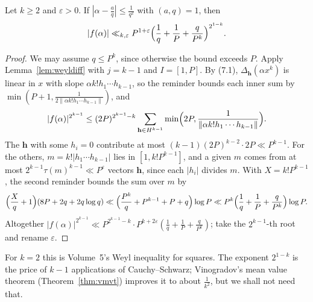 \begin{theorem}\label{thm:weylk}
Let $k\ge2$ and $\varepsilon>0$. If $|\alpha-\frac aq|\le\frac1{q^2}$ with $(a,q)=1$, then
\[
|f(\alpha)|\ll_{k,\varepsilon}P^{1+\varepsilon}\Bigl(\frac1q+\frac1P+\frac q{P^k}\Bigr)^{2^{1-k}}.
\]
\end{theorem}
\begin{proof}
We may assume $q\le P^k$, since otherwise the bound exceeds $P$. Apply Lemma~\ref{lem:weyldiff} with $j=k-1$ and $I=[1,P]$. By (7.1), $\Delta_{\mathbf h}(\alpha x^k)$ is linear in $x$ with slope $\alpha k!h_1\cdots h_{k-1}$, so the reminder bounds each inner sum by $\min(P+1,\frac1{2\|\alpha k!h_1\cdots h_{k-1}\|})$, and
\[
|f(\alpha)|^{2^{k-1}}\le(2P)^{2^{k-1}-k}\sum_{\mathbf h\in H^{k-1}}\min\Bigl(2P,\frac1{\|\alpha k!h_1\cdots h_{k-1}\|}\Bigr).
\]
The $\mathbf h$ with some $h_i=0$ contribute at most $(k-1)(2P)^{k-2}\cdot2P\ll P^{k-1}$. For the others, $m=k!|h_1\cdots h_{k-1}|$ lies in $[1,k!P^{k-1}]$, and a given $m$ comes from at most $2^{k-1}\tau(m)^{k-1}\ll P^\varepsilon$ vectors $\mathbf h$, since each $|h_i|$ divides $m$. With $X=k!P^{k-1}$, the second reminder bounds the sum over $m$ by
\[
\Bigl(\frac Xq+1\Bigr)(8P+2q+2q\log q)\ll\Bigl(\frac{P^k}q+P^{k-1}+P+q\Bigr)\log P\ll P^k\Bigl(\frac1q+\frac1P+\frac q{P^k}\Bigr)\log P.
\]
Altogether $|f(\alpha)|^{2^{k-1}}\ll P^{2^{k-1}-k}\cdot P^{k+2\varepsilon}(\frac1q+\frac1P+\frac q{P^k})$; take the $2^{k-1}$-th root and rename $\varepsilon$.
\end{proof}

For $k=2$ this is Volume~5's Weyl inequality for squares. The exponent $2^{1-k}$ is the price of $k-1$ applications of Cauchy--Schwarz; Vinogradov's mean value theorem (Theorem~\ref{thm:vmvt}) improves it to about $\frac1{k^2}$, but we shall not need that.

